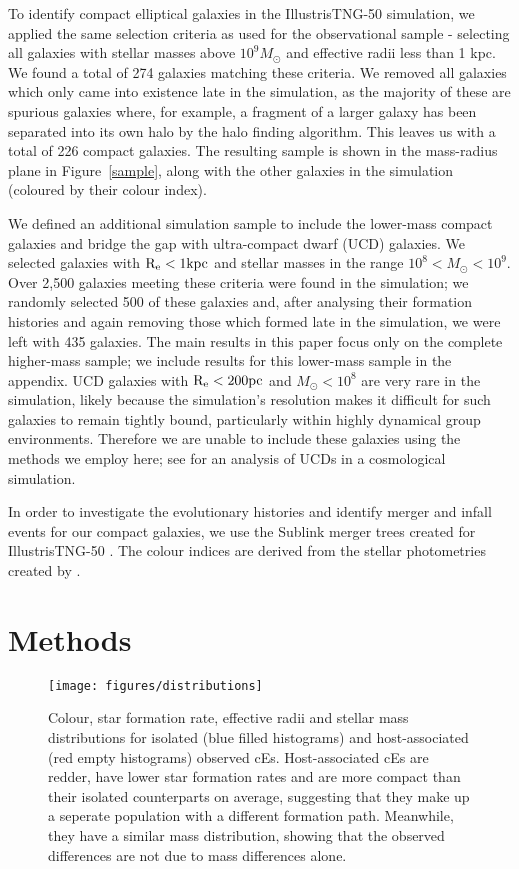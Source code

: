 \documentclass[a4paper,fleqn,usenatbib]{mnras}
\begin{document}
To identify compact elliptical galaxies in the IllustrisTNG-50 simulation, we applied the same selection criteria as used for the observational sample - selecting all galaxies with stellar masses above $10^{9}  M_{\odot}$ and effective radii less than 1 kpc. We found a total of 274 galaxies matching these criteria. We removed all galaxies which only came into existence late in the simulation, as the majority of these are spurious galaxies where, for example, a fragment of a larger galaxy has been separated into its own halo by the halo finding algorithm. This leaves us with a total of 226 compact galaxies. The resulting sample is shown in the mass-radius plane in Figure~\ref{sample}, along with the other galaxies in the simulation (coloured by their colour index). 

We defined an additional simulation sample to include the lower-mass compact galaxies and bridge the gap with ultra-compact dwarf (UCD) galaxies. We selected galaxies with ${\rm R_{e} < 1 kpc}$ and stellar masses in the range $10^{8} < M_{\odot} < 10^{9}$. Over 2,500 galaxies meeting these criteria were found in the simulation; we randomly selected 500 of these galaxies and, after analysing their formation histories and again removing those which formed late in the simulation, we were left with 435 galaxies. The main results in this paper focus only on the complete higher-mass sample; we include results for this lower-mass sample in the appendix. UCD galaxies with ${\rm R_{e} < 200 pc}$ and  $ M_{\odot} < 10^{8}$ are very rare in the simulation, likely because the simulation's resolution makes it difficult for such galaxies to remain tightly bound, particularly within highly dynamical group environments. Therefore we are unable to include these galaxies using the methods we employ here; see \citet{2019lgei.confE..33M} for an analysis of UCDs in a cosmological simulation.

In order to investigate the evolutionary histories and identify merger and infall events for our compact galaxies, we use the Sublink merger trees created for IllustrisTNG-50 \citep{2015MNRAS.449...49R}. The colour indices are derived from the stellar photometries created by \citet{2018MNRAS.475..624N}. 



\section{Methods}
\label{methods}


\begin{figure}
\texttt{[image: figures/distributions]}
   \caption{Colour, star formation rate, effective radii and stellar mass distributions for isolated (blue filled histograms) and host-associated (red empty histograms) observed cEs. Host-associated cEs are redder, have lower star formation rates and are more compact than their isolated counterparts on average, suggesting that they make up a seperate population with a different formation path. Meanwhile, they have a similar mass distribution, showing that the observed differences are not due to mass differences alone.}
 \label{distribution}
 \end{figure}
\end{document}
